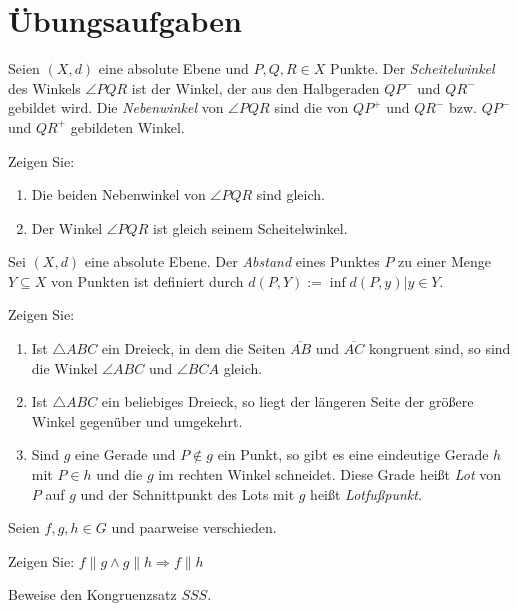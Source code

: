 \clearpage
\section*{Übungsaufgaben}

\begin{aufgabe}\label{ub11:aufg1}
    Seien $(X, d)$ eine absolute Ebene und $P, Q, R \in X$ Punkte.
    Der \textit{Scheitelwinkel} des Winkels $\angle PQR$ ist
    der Winkel, der aus den Halbgeraden $QP^-$ und $QR^-$ gebildet
    wird. Die \textit{Nebenwinkel} von $\angle PQR$
    sind die von $QP^+$ und $QR^-$ bzw. $QP^-$ und $QR^+$ gebildeten
    Winkel.

    Zeigen Sie:
    \begin{enumerate}[label=(\alph*)]
        \item Die beiden Nebenwinkel von $\angle PQR$ sind gleich.
        \item Der Winkel $\angle PQR$ ist gleich seinem Scheitelwinkel.
    \end{enumerate}
\end{aufgabe}

\begin{aufgabe}\label{ub11:aufg3}
    Sei $(X, d)$ eine absolute Ebene. Der \textit{Abstand} eines 
    Punktes $P$ zu einer Menge $Y \subseteq X$ von Punkten ist
    definiert durch $d(P, Y) := \inf{d(P, y) | y \in Y}$.

    Zeigen Sie:
    \begin{enumerate}[label=(\alph*),ref=\theenumi{} (\alph*)]
        \item Ist $\triangle ABC$ ein Dreieck, in dem die Seiten
              $\overline{AB}$ und $\overline{AC}$ kongruent sind, so
              sind die Winkel $\angle ABC$ und $\angle BCA$ gleich.
        \item Ist $\triangle ABC$ ein beliebiges Dreieck, so liegt 
              der längeren Seite der größere Winkel gegenüber und
              umgekehrt.
        \item \label{ub11:aufg3.c} Sind $g$ eine Gerade und $P \notin g$ ein Punkt, so gibt
              es eine eindeutige Gerade $h$ mit $P \in h$ und die
              $g$ im rechten Winkel schneidet. Diese Grade heißt 
              \textit{Lot} von $P$ auf $g$ und der 
              Schnittpunkt des Lots mit $g$ heißt \textit{Lotfußpunkt}.
    \end{enumerate}
\end{aufgabe}

\begin{aufgabe}\label{ub-tut-24:a1}
    Seien $f, g, h \in G$ und paarweise verschieden.

    Zeigen Sie: $f \parallel g \land g \parallel h \Rightarrow f \parallel h$
\end{aufgabe}

\begin{aufgabe}\label{ub-tut-24:a3}
    Beweise den Kongruenzsatz $SSS$.
\end{aufgabe}
